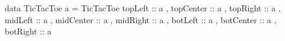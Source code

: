 \begin{code}
data TicTacToe a = TicTacToe
  { topLeft   :: a
  , topCenter :: a
  , topRight  :: a
  , midLeft   :: a
  , midCenter :: a
  , midRight  :: a
  , botLeft   :: a
  , botCenter :: a
  , botRight  :: a
  }
\end{code}
